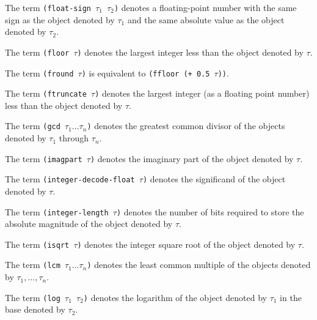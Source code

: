 {The term {\tt (float-sign $\tau_1$ $\tau_2$)} denotes a floating-point
number with the same sign as the object denoted by $\tau_1$ and
the same absolute value as the object denoted by $\tau_2$.}



{The term {\tt (floor $\tau$)} denotes the largest integer less than the object denoted by
$\tau$.}



{The term {\tt (fround $\tau$)} is equivalent to {\tt (ffloor (+ 0.5 $\tau$))}.}



{The term {\tt (ftruncate $\tau$)} denotes the largest integer (as a floating point number)
less than the object denoted by $\tau$.}



{The term {\tt (gcd $\tau_1 \ldots \tau_n$)} denotes the greatest common divisor of the
objects denoted by $\tau_1$ through $\tau_n$.}



{The term {\tt (imagpart $\tau$)} denotes the imaginary part of the
object denoted by $\tau$.}



{The term {\tt (integer-decode-float $\tau$)} denotes the significand
of the object denoted by $\tau$.}



{The term {\tt (integer-length $\tau$)} denotes the number of bits
required to store the absolute magnitude of the object denoted by
$\tau$.}



{The term {\tt (isqrt $\tau$)} denotes the integer square root of the
object denoted by $\tau$.}



{The term {\tt (lcm $\tau_1 \ldots \tau_n$)} denotes the least common
multiple of the objects denoted by $\tau_1,\ldots,\tau_n$.}



{The term {\tt (log $\tau_1$ $\tau_2$)} denotes the logarithm of the
object denoted by $\tau_1$ in the base denoted by $\tau_2$.}




